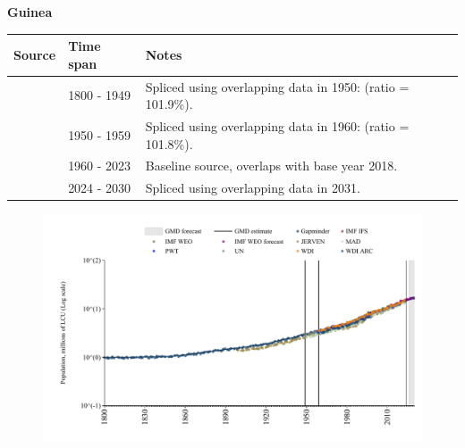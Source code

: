 \documentclass[12pt,a4paper,landscape]{article}
\begin{document}
\begin{adjustbox}{max totalsize={\paperwidth}{\paperheight},center}
\begin{minipage}[t][\textheight][t]{\textwidth}
\vspace*{0.5cm}
{}
\begin{center}
{\Large\bfseries Guinea}
\end{center}
\vspace{0.5cm}
\begin{table}[H]
\centering
\small
\begin{tabular}{|l|l|l|}
\hline
\textbf{Source} & \textbf{Time span} & \textbf{Notes} \\
\hline
\rowcolor{white}\cite{Gapminder}& 1800 - 1949 &Spliced using overlapping data in 1950: (ratio = 101.9\%).\\
\rowcolor{lightgray}\cite{IMF_IFS}& 1950 - 1959 &Spliced using overlapping data in 1960: (ratio = 101.8\%).\\
\rowcolor{white}\cite{WDI}& 1960 - 2023 &Baseline source, overlaps with base year 2018.\\
\rowcolor{lightgray}\cite{Gapminder}& 2024 - 2030 &Spliced using overlapping data in 2031.\\
\hline
\end{tabular}
\end{table}
\begin{figure}[H]
\centering
\includegraphics[width=\textwidth,height=0.6\textheight,keepaspectratio]{graphs/GIN_pop.pdf}
\end{figure}
\end{minipage}
\end{adjustbox}
\end{document}
